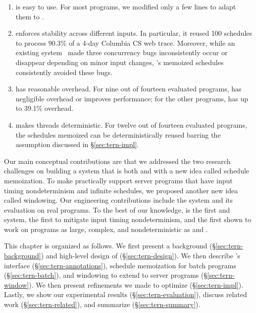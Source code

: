 \begin{enumerate}

\item \tern is easy to use.  For most programs, we modified only a few
  lines to adapt them to \tern.

\item \tern enforces stability across different inputs.  In particular, it
  reused 100 schedules to process 90.3\% of a 4-day Columbia CS web trace.
  Moreover, while an existing \dmt system~\cite{coredet:asplos10} made
  three concurrency bugs inconsistently occur or disappear depending on minor
  input changes, \tern's memoized schedules consistently avoided these bugs.

\item \tern has reasonable overhead.  For nine out of fourteen
  evaluated programs, \tern has negligible overhead or improves
  performance; for the other programs, \tern has up to 39.1\%
  overhead.

\item \tern makes threads deterministic.  For twelve out of fourteen
  evaluated programs, the schedules \tern memoized can be deterministically
  reused barring the assumption discussed in \S\ref{sec:tern-impl}.

\end{enumerate}

Our main conceptual contributions are that we addressed the two research
challenges on building a system that is both \smt and \dmt with a new idea
called schedule memoization. To make \tern practically support server programs
that have input timing nondeterminism and infinite schedules, we proposed
another new idea called windowing. Our engineering contributions include the
\tern system and its evaluation on real programs.  To the best of our knowledge,
\tern is the first \smt and \dmt system, the first to mitigate input timing
nondeterminism, and the first shown to work on programs as large, complex, and
nondeterministic as \apache and \mysql.

This chapter is organized as follows.  We first present a background
(\S\ref{sec:tern-background}) and high-level design of
\tern (\S\ref{sec:tern-design}). We then describe \tern's interface
(\S\ref{sec:tern-annotations}), schedule memoization for batch programs
(\S\ref{sec:tern-batch}), and windowing to extend \tern to server programs
(\S\ref{sec:tern-window}).  We then present refinements we made to optimize
\tern (\S\ref{sec:tern-impl}).  Lastly, we show our experimental results
(\S\ref{sec:tern-evaluation}), discuss related work (\S\ref{sec:tern-related}),
and summarize \tern (\S\ref{sec:tern-summary}).
